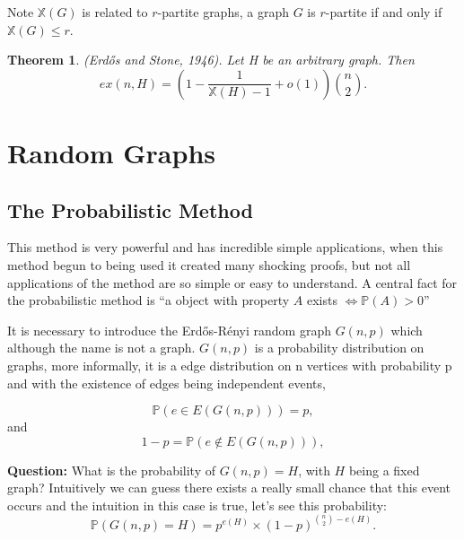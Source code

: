 \documentclass[12pt,twoside,a4paper]{book}
\numberwithin{equation}{section}
\newtheorem{theorem}             {Theorem}[section]
\theoremstyle{remark}
\begin{document}
Note $\mathbb{X}(G)$ is related to $r$-partite graphs, a graph $G$ is $r$-partite if and only if $\mathbb{X}(G) \leq r$.

\begin{theorem}
(Erd\H{o}s and Stone, 1946). Let H be an arbitrary graph. Then
$$ ex(n,H) = \left(1-\frac{1}{\mathbb{X}(H)-1} + o(1)\right) \binom{n}{2}.$$ 
\end{theorem}
\chapter{Random Graphs}
\section{The Probabilistic Method}
This method is very powerful and has incredible simple applications, when this method begun to being used it created many shocking proofs, but not all applications of the method are so simple or easy to understand. A central fact for the probabilistic method is ``a object with property $ A$ exists $\iff  \mathbb{P}(A)>0$''

It is necessary to introduce the Erd\H{o}s-Rényi random graph $G(n,p)$ which although the name is not a graph. $G(n,p)$ is a probability distribution on graphs, more informally, it is a edge distribution on n vertices with probability p and with the existence of edges being independent events,

$$\mathbb{P}(e \in E(G(n,p)))=p ,$$
and
$$ 1-p=\mathbb{P}(e \notin E(G(n,p))),$$

{\bf Question:} What is the probability of $G(n,p) = H$, with $H$ being a fixed graph?
Intuitively we can guess there exists a really small chance that this event occurs and the intuition in this case is true, let's see this probability:
$$\mathbb{P}(G(n,p)=H) = p^{e(H)}\times (1-p)^{\binom{n}{2}-e(H)}.$$
\end{document}
